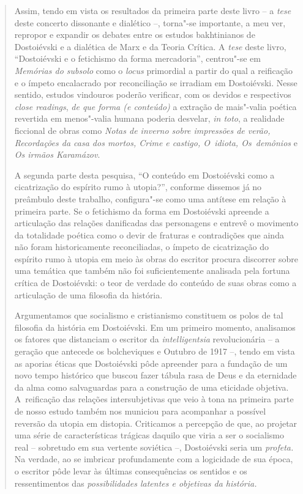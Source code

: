 {\begin{quote}
Assim, tendo em vista os resultados da primeira parte deste livro -- a
\emph{tese} deste concerto dissonante e dialético --, torna"-se
importante, a meu ver, repropor e expandir os debates entre os estudos
bakhtinianos de Dostoiévski e a dialética de Marx e da Teoria Crítica. A
\emph{tese} deste livro, ``Dostoiévski e o fetichismo da forma
mercadoria'', centrou"-se em \emph{Memórias do subsolo} como o
\emph{locus} primordial a partir do qual a reificação e o ímpeto
encalacrado por reconciliação se irradiam em Dostoiévski. Nesse sentido,
estudos vindouros poderão verificar, com os devidos e respectivos
\emph{close readings}, \emph{de que forma (e conteúdo)} a extração de
mais"-valia poética revertida em menos"-valia humana poderia desvelar,
\emph{in toto}, a realidade ficcional de obras como \emph{Notas de
inverno sobre impressões de verão, Recordações da casa dos mortos, Crime
e castigo, O~idiota, Os~demônios} e \emph{Os irmãos Karamázov}.

A segunda parte desta pesquisa, ``O conteúdo em Dostoiévski como a
cicatrização do espírito rumo à utopia?'', conforme dissemos já no
preâmbulo deste trabalho, configura"-se como uma antítese em relação à
primeira parte. Se o fetichismo da forma em Dostoiévski apreende a
articulação das relações danificadas das personagens e entrevê o
movimento da totalidade poética como o devir de fraturas e contradições
que ainda não foram historicamente reconciliadas, o ímpeto de
cicatrização do espírito rumo à utopia em meio às obras do escritor
procura discorrer sobre uma temática que também não foi suficientemente
analisada pela fortuna crítica de Dostoiévski: o teor de verdade do
conteúdo de suas obras como a articulação de uma filosofia da história.

Argumentamos que socialismo e cristianismo constituem os polos de tal
filosofia da história em Dostoiévski. Em um primeiro momento, analisamos
os fatores que distanciam o escritor da \emph{intelligentsia}
revolucionária -- a geração que antecede os bolcheviques e Outubro de
1917 --, tendo em vista as aporias éticas que Dostoiévski pôde apreender
para a fundação de um novo tempo histórico que buscou fazer tábula rasa
de Deus e da eternidade da alma como salvaguardas para a construção de
uma eticidade objetiva. A~reificação das relações intersubjetivas que
veio à tona na primeira parte de nosso estudo também nos municiou para
acompanhar a possível reversão da utopia em distopia. Criticamos a
percepção de que, ao projetar uma série de características trágicas
daquilo que viria a ser o socialismo real -- sobretudo em sua vertente
soviética --, Dostoiévski seria um \emph{profeta.} Na verdade, ao se
imbricar profundamente com a logicidade de sua época, o escritor pôde
levar às últimas consequências os sentidos e os ressentimentos das
\emph{possibilidades latentes e objetivas da história. }


\end{quote}}
